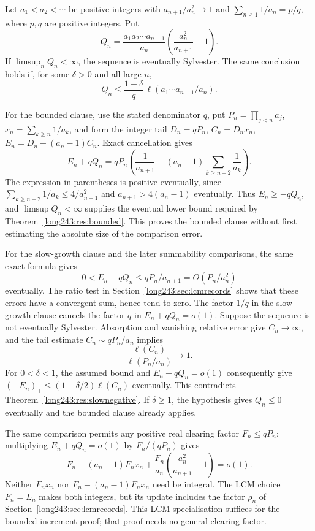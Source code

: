 \documentclass[11pt]{article}
\begin{document}
\begin{theorem}\label{long243:res:strausbounded}
Let $a_1<a_2<\cdots$ be positive integers with $a_{n+1}/a_n^2\to1$
and $\sum_{n\ge1}1/a_n=p/q$, where $p,q$ are positive integers. Put
\[
 Q_n=\frac{a_1a_2\cdots a_{n-1}}{a_n}
     \left(\frac{a_n^2}{a_{n+1}}-1\right).
\]
If $\limsup_nQ_n<\infty$, the sequence is eventually Sylvester.
The same conclusion holds if, for some $\delta>0$ and all large $n$,
\[
 Q_n\le\frac{1-\delta}{q}\,
 \ell(a_1\cdots a_{n-1}/a_n).
\]
\end{theorem}

For the bounded clause, use the stated denominator $q$, put
$P_n=\prod_{j<n}a_j$, $x_n=\sum_{k\ge n}1/a_k$, and form the integer tail
$D_n=qP_n$, $C_n=D_nx_n$, $E_n=D_n-(a_n-1)C_n$. Exact cancellation gives
\[
 E_n+qQ_n=qP_n\left(\frac1{a_{n+1}}
 -(a_n-1)\sum_{k\ge n+2}\frac1{a_k}\right).
\]
The expression in parentheses is positive eventually, since
$\sum_{k\ge n+2}1/a_k\le4/a_{n+1}^2$ and
$a_{n+1}>4(a_n-1)$ eventually. Thus $E_n\ge-qQ_n$,
and $\limsup Q_n<\infty$ supplies the eventual lower bound required
by Theorem~\ref{long243:res:bounded}. This proves the bounded clause
without first estimating the absolute size of the comparison error.

For the slow-growth clause and the later summability comparisons,
the same exact formula gives
\[
 0<E_n+qQ_n\le qP_n/a_{n+1}=O(P_n/a_n^2)
\]
eventually. The ratio test in Section~\ref{long243:sec:lcmrecords}
shows that these errors have a convergent sum, hence tend to zero.
The factor $1/q$ in the slow-growth clause cancels the factor $q$ in
$E_n+qQ_n=o(1)$. Suppose the sequence is not eventually Sylvester. Absorption
and vanishing relative error give $C_n\to\infty$, and the tail estimate
$C_n\sim qP_n/a_n$ implies
\[
 \frac{\ell(C_n)}{\ell(P_n/a_n)}\longrightarrow1.
\]
For $0<\delta<1$, the assumed bound and $E_n+qQ_n=o(1)$ consequently give
$(-E_n)_+\le(1-\delta/2)\ell(C_n)$ eventually. This contradicts
Theorem~\ref{long243:res:slownegative}. If $\delta\ge1$, the hypothesis gives
$Q_n\le0$ eventually and the bounded clause already applies.

The same comparison permits any positive real clearing factor
$F_n\le qP_n$: multiplying $E_n+qQ_n=o(1)$ by $F_n/(qP_n)$ gives
\[
 F_n-(a_n-1)F_nx_n+
 \frac{F_n}{a_n}\left(\frac{a_n^2}{a_{n+1}}-1\right)=o(1).
\]
Neither $F_nx_n$ nor $F_n-(a_n-1)F_nx_n$ need be integral. The LCM
choice $F_n=L_n$ makes both integers, but its update includes the
factor $\rho_n$ of Section~\ref{long243:sec:lcmrecords}. This LCM specialisation suffices for the bounded-increment proof;
that proof needs no general clearing factor.
\end{document}

